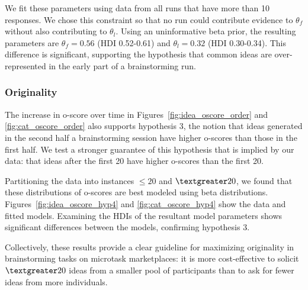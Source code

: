 We fit these parameters using data from all runs that have more than 10 responses. We chose this constraint so that no run could contribute evidence to $\theta_f$ without also contributing to $\theta_l$. Using an uninformative beta prior, the resulting parameters are $\theta_f = 0.56$ (HDI 0.52-0.61) and $\theta_l = 0.32$ (HDI 0.30-0.34). This difference is significant, supporting the hypothesis that common ideas are over-represented in the early part of a brainstorming run.



\subsubsection{Originality}

The increase in o-score over time in Figures~\ref{fig:idea_oscore_order} and \ref{fig:cat_oscore_order} also supports hypothesis 3, the notion that ideas generated in the second half a brainstorming session have higher o-scores than those in the first half. We test a stronger guarantee of this hypothesis that is implied by our data: that ideas after the first 20 have higher o-scores than the first 20.

Partitioning the data into instances $\leq20$ and $\textgreater20$, we found that these distributions of o-scores are best modeled using beta distributions. Figures~\ref{fig:idea_oscore_hyp4} and \ref{fig:cat_oscore_hyp4} show the data and fitted models. Examining the HDIs of the resultant model parameters shows significant differences between the models, confirming hypothesis 3.

Collectively, these results provide a clear guideline for maximizing originality in brainstorming tasks on microtask marketplaces: it is more cost-effective to solicit $\textgreater20$ ideas from a smaller pool of participants than to ask for fewer ideas from more individuals.




